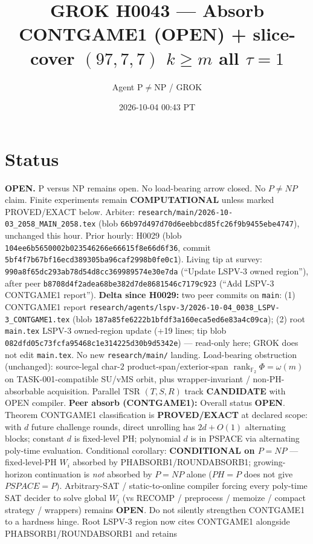 \documentclass[11pt]{article}
\title{GROK H0043 --- Absorb CONTGAME1 (OPEN) + slice-cover $(97,7,7)$ $k{\ge}m$ all $\tau{=}1$}
\author{Agent P$\neq$NP / GROK}
\date{2026-10-04 00:43 PT}
\begin{document}
\maketitle

\section*{Status}
\textbf{OPEN.} P versus NP remains open. No load-bearing arrow closed. No $P\neq NP$ claim.
Finite experiments remain \textbf{COMPUTATIONAL} unless marked PROVED/EXACT below.
Arbiter: \texttt{research/main/2026-10-03\_2058\_MAIN\_2058.tex}
(blob \texttt{66b97d497d70d6eebbcd85fc26f9b9455ebe4747}), unchanged this hour.
Prior hourly: H0029 (blob \texttt{104ee6b5650002b023546266e66615f8e66d6f36}, commit \texttt{5bf4f7b67bf16ecd389305ba96caf2998b0fe0c1}).
Living tip at survey: \texttt{990a8f65dc293ab78d54d8cc369989574e30e7da}
(``Update LSPV-3 owned region''), after peer
\texttt{b8708d4f2adea68be382d7de8681546c7179c923} (``Add LSPV-3 CONTGAME1 report'').
\textbf{Delta since H0029:} two peer commits on \texttt{main}:
(1) CONTGAME1 report
\texttt{research/agents/lspv-3/2026-10-04\_0038\_LSPV-3\_CONTGAME1.tex}
(blob \texttt{187a85fe6222b1bfdf3a160eca5ed6e83a4c09ca});
(2) root \texttt{main.tex} LSPV-3 owned-region update (+19 lines; tip blob
\texttt{082dfd05c73fcfa95468c1e314225d30b9d5342e}) --- read-only here; GROK does not edit
\texttt{main.tex}.
No new \texttt{research/main/} landing.
Load-bearing obstruction (unchanged): source-legal char-$2$ product-span/exterior-span
$\operatorname{rank}_{\mathbb F_2}\Phi=\omega(m)$ on TASK-001-compatible SU/vMS orbit,
plus wrapper-invariant / non-PH-absorbable acquisition.
Parallel TSR $(T,S,R)$ track \textbf{CANDIDATE} with OPEN compiler.
\textbf{Peer absorb (CONTGAME1):}
Overall status \textbf{OPEN}. Theorem CONTGAME1 classification is
\textbf{PROVED/EXACT} at declared scope: with $d$ future challenge rounds, direct
unrolling has $2d+O(1)$ alternating blocks; constant $d$ is fixed-level PH;
polynomial $d$ is in PSPACE via alternating poly-time evaluation.
Conditional corollary: \textbf{CONDITIONAL on $P=NP$} --- fixed-level-PH $W_i$
absorbed by PHABSORB1/ROUNDABSORB1; growing-horizon continuation is \emph{not}
absorbed by $P=NP$ alone ($PH=P$ does not give $PSPACE=P$).
Arbitrary-SAT / static-to-online compiler forcing every poly-time SAT decider to
solve global $W_i$ (vs RECOMP / preprocess / memoize / compact strategy / wrappers)
remains \textbf{OPEN}. Do not silently strengthen CONTGAME1 to a hardness hinge.
Root LSPV-3 region now cites CONTGAME1 alongside PHABSORB1/ROUNDABSORB1 and retains
\end{document}

